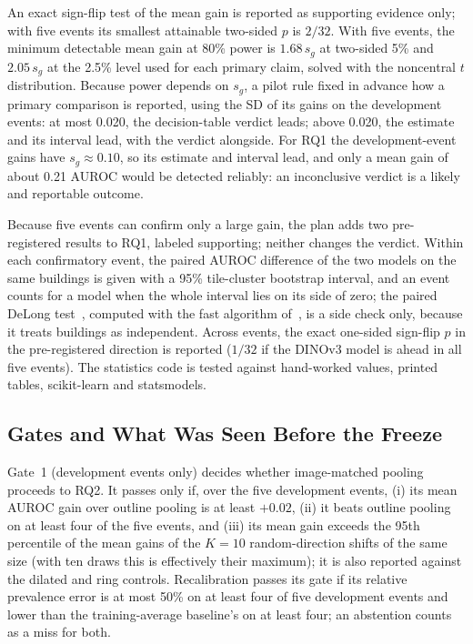 \documentclass{ieeeaccess}
\begin{document}
An exact sign-flip test of the mean gain is reported as supporting evidence only; with five events its smallest attainable two-sided $p$ is $2/32$. With five events, the minimum detectable mean gain at 80\% power is $1.68\,s_g$ at two-sided 5\% and $2.05\,s_g$ at the 2.5\% level used for each primary claim, solved with the noncentral $t$ distribution. Because power depends on $s_g$, a pilot rule fixed in advance how a primary comparison is reported, using the SD of its gains on the development events: at most 0.020, the decision-table verdict leads; above 0.020, the estimate and its interval lead, with the verdict alongside. For RQ1 the development-event gains have $s_g\approx0.10$, so its estimate and interval lead, and only a mean gain of about 0.21 AUROC would be detected reliably: an inconclusive verdict is a likely and reportable outcome.

Because five events can confirm only a large gain, the plan adds two pre-registered results to RQ1, labeled supporting; neither changes the verdict. Within each confirmatory event, the paired AUROC difference of the two models on the same buildings is given with a 95\% tile-cluster bootstrap interval, and an event counts for a model when the whole interval lies on its side of zero; the paired DeLong test~\cite{delong1988comparing}, computed with the fast algorithm of~\cite{sun2014fast}, is a side check only, because it treats buildings as independent. Across events, the exact one-sided sign-flip $p$ in the pre-registered direction is reported ($1/32$ if the DINOv3 model is ahead in all five events). The statistics code is tested against hand-worked values, printed tables, scikit-learn and statsmodels.

\subsection{Gates and What Was Seen Before the Freeze}
Gate~1 (development events only) decides whether image-matched pooling proceeds to RQ2. It passes only if, over the five development events, (i) its mean AUROC gain over outline pooling is at least $+0.02$, (ii) it beats outline pooling on at least four of the five events, and (iii) its mean gain exceeds the 95th percentile of the mean gains of the $K=10$ random-direction shifts of the same size (with ten draws this is effectively their maximum); it is also reported against the dilated and ring controls. Recalibration passes its gate if its relative prevalence error is at most 50\% on at least four of five development events and lower than the training-average baseline's on at least four; an abstention counts as a miss for both.
\end{document}
